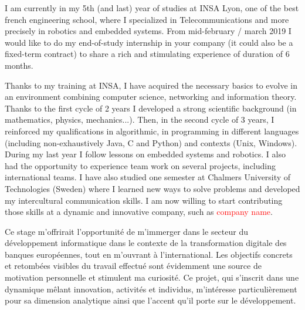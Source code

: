 \documentclass[11pt, a4paper]{awesome-cv}
\begin{document}
\makecvheader[R]


\makelettertitle

\begin{cvletter}

I am currently in my 5th (and last) year of studies at INSA Lyon, one of the best french engineering school, where I specialized in Telecommunications and more precisely in robotics and embedded systems. From mid-february / march 2019 I would like to do my end-of-study internship in your company (it could also be a fixed-term contract) to share a rich and stimulating experience of duration of 6 months. 

\vspace{2mm} %

Thanks to my training at INSA, I have acquired the necessary basics to evolve in an environment combining computer science, networking and information theory. Thanks to the first cycle of 2 years I developed a strong scientific background (in mathematics, physics, mechanics...). Then, in the second cycle of 3 years, I reinforced my qualifications in algorithmic, in programming in different languages (including non-exhaustively Java, C and Python) and contexts (Unix, Windows). During my last year I follow lessons on embedded systems and robotics. I also had the opportunity to experience team work on several projects, including international teams. I have also studied one semester at Chalmers University of Technologies (Sweden) where I learned new ways to solve problems and developed my intercultural communication skills. \newline 
I am now willing to start contributing those skills at a dynamic and innovative company, such as \textcolor{red}{company name}. 

\vspace{2mm} %

Ce stage m'offrirait l'opportunité de m'immerger dans le secteur du développement informatique dans le contexte de la transformation digitale des banques européennes, tout en m'ouvrant à l'international. Les objectifs concrets et retombées visibles du travail effectué sont évidemment une source de motivation personnelle et stimulent ma curiosité. Ce projet, qui s'inscrit dans une dynamique mêlant innovation, activités et individus, m'intéresse particulièrement pour sa dimension analytique ainsi que l'accent qu'il porte sur le développement.  %


\end{cvletter}
\end{document}
